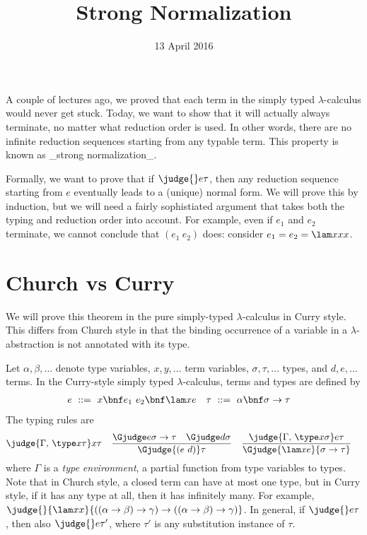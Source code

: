 \title{Strong Normalization}
\date{13 April 2016}
\maketitle

\newcommand\osubst[2]{#1\{#2\}}

A couple of lectures ago, we proved that each term in the simply typed
$\lambda$-calculus would never get stuck. Today, we want to show that
it will actually always terminate, no matter what reduction order is
used. In other words, there are no infinite reduction sequences
starting from any typable term.  This property is known as _strong
normalization_.

Formally, we want to prove that if $\judge{}e\tau$, then any reduction
sequence starting from $e$ eventually leads to a (unique) normal form.
We will prove this by induction, but we will need a fairly
sophistiated argument that takes both the typing and reduction order
into account. For example, even if $e_1$ and $e_2$ terminate, we
cannot conclude that $(e_1~e_2)$ does: consider $e_1=e_2=\lam x{xx}$.
\section{Church vs Curry}

We will prove this theorem in the pure simply-typed $\lambda$-calculus
in Curry style.  This differs from Church style in that the binding
occurrence of a variable in a $\lambda$-abstraction is not annotated
with its type.

Let $\alpha,\beta,\ldots$ denote type variables, $x,y,\ldots$ term
variables, $\sigma,\tau,\ldots$ types, and $d,e,\ldots$ terms. In the
Curry-style simply typed $\lambda$-calculus, terms and types are
defined by
\begin{align*}
& e\ ::=\ x \bnf e_1~e_2 \bnf \lam xe && \tau\ ::=\ \alpha \bnf \sigma\to\tau
\end{align*}
The typing rules are
\begin{align*}
& \judge{\Gamma,\,\type x\tau}x\tau &&
\frac{\Gjudge e{\sigma\to\tau}\quad\Gjudge d\sigma}{\Gjudge{(e~d)}\tau} &&
\frac{\judge{\Gamma,\,\type x\sigma}e\tau}{\Gjudge{\lam xe}{\sigma\to\tau}}
\end{align*}
where $\Gamma$ is a \emph{type environment}, a partial function from type variables to types.
Note that in Church style, a closed term can have at most one type, but in Curry style, if it has any type at all, then it has infinitely many. For example, $\judge{}{\lam xx}{((\alpha\to\beta)\to\gamma)\to((\alpha\to\beta)\to\gamma)}$. In general, if $\judge{}e\tau$, then also $\judge{}e{\tau'}$, where $\tau'$ is any substitution instance of $\tau$.

